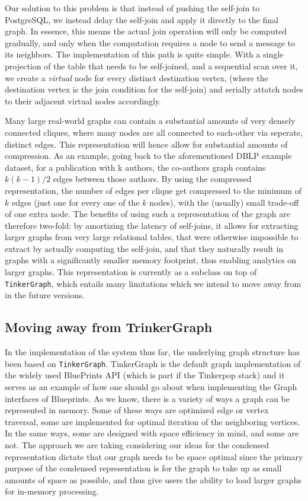 \documentclass[11pt,letterpaper]{article}
\begin{document}
Our solution to this problem is that instead of pushing the self-join to PostgreSQL, we instead delay the self-join and apply it directly to the final graph. In essence, this means the actual join operation will only be computed gradually, and only when the computation requires a node to send a message to its neighbors. The implementation of this path is quite simple. With a single projection of the table that needs to be self-joined, and a sequential scan over it, we create a \textit{virtual} node for every distinct destination vertex, (where the destination vertex is the join condition for the self-join) and serially attatch nodes to their adjacent virtual nodes accordingly.

Many large real-world graphs can contain a substantial amounts of very densely connected cliques, where many nodes are all connected to each-other via seperate, distinct edges. This representation will hence allow for substantial amounts of compression. As an example, going back to the aforementioned DBLP example dataset, for a publication with k authors, the co-authors graph contains $k(k-1)/2$ edges between those authors. By using the compressed representation, the number of edges per clique get compressed to the minimum of $k$ edges (just one for every one of the $k$ nodes), with the (usually) small trade-off of one extra node. The benefits of using such a representation of the graph are therefore two-fold: by amortizing the latency of  self-joins, it allows for extracting larger graphs from very large relational tables, that were otherwise impossible to extract by actually computing the self-join, and that they naturally result in graphs with a significantly smaller memory footprint, thus enabling analytics on larger graphs. This representation is currently as a subclass on top of \texttt{TinkerGraph}, which entails many limitations which we intend to move away from in the future versions.


\subsection*{Moving away from TrinkerGraph}

In the implementation of the system thus far, the underlying graph structure has been based on \texttt{TinkerGraph}. TinkerGraph is the default graph implementation of the widely used BluePrints API (which is part if the Tinkerpop \cite{tinkerpop} stack) and it serves as an example of how one should go about when implementing the Graph interfaces of Blueprints.
As we know, there is a variety of ways a graph can be represented in memory. Some of these ways are optimized edge or vertex traversal, some are implemented for optimal iteration of the neighboring vertices. In the same ways, some are designed with space efficiency in mind, and some are not. The approach we are taking considering our ideas for the condensed representation dictate that our graph needs to be space optimal since  the primary purpose of the condensed representation is for the graph to take up as small amounts of space as possible, and thus give users the ability to load larger graphs for in-memory processing.
\end{document}
